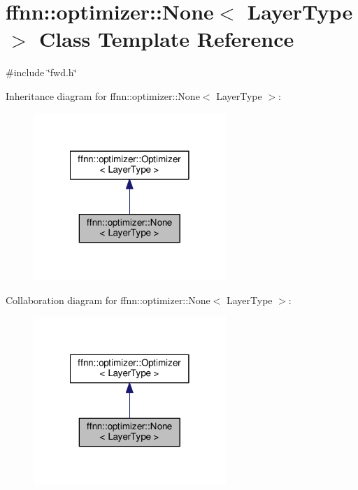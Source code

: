 \hypertarget{classffnn_1_1optimizer_1_1_none}{\section{ffnn\-:\-:optimizer\-:\-:None$<$ Layer\-Type $>$ Class Template Reference}
\label{classffnn_1_1optimizer_1_1_none}
}


{\ttfamily \#include \char`\"{}fwd.\-h\char`\"{}}



Inheritance diagram for ffnn\-:\-:optimizer\-:\-:None$<$ Layer\-Type $>$\-:\nopagebreak
\begin{figure}[H]
\begin{center}
\leavevmode
\includegraphics[width=206pt]{classffnn_1_1optimizer_1_1_none__inherit__graph}
\end{center}
\end{figure}


Collaboration diagram for ffnn\-:\-:optimizer\-:\-:None$<$ Layer\-Type $>$\-:\nopagebreak
\begin{figure}[H]
\begin{center}
\leavevmode
\includegraphics[width=206pt]{classffnn_1_1optimizer_1_1_none__coll__graph}
\end{center}
\end{figure}
